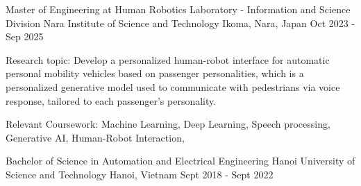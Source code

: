 

\begin{cventries}

  \cventry
    {Master of Engineering at Human Robotics Laboratory - Information and Science Division} %
    {Nara Institute of Science and Technology} %
    {Ikoma, Nara, Japan} %
    {Oct 2023 - Sep 2025} %
    {
      \begin{cvitems} %
        \item {Research topic: Develop a personalized human-robot interface for automatic personal mobility vehicles based on passenger personalities, which is a personalized generative model used to communicate with pedestrians via voice response, tailored to each passenger's personality.}
        \item {Relevant Coursework: Machine Learning, Deep Learning, Speech processing, Generative AI, Human-Robot Interaction, }
      \end{cvitems}
    }
  \cventry
    {Bachelor of Science in Automation and Electrical Engineering} %
    {Hanoi University of Science and Technology} %
    {Hanoi, Vietnam} %
    {Sept 2018 - Sept 2022} %
    {
}
\end{cventries}
